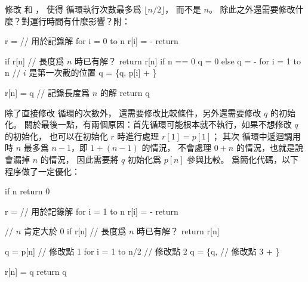 \startEXERCISE
修改  和 ，
使得  循環執行次數最多爲 $\lfloor n/2\rfloor$，
而不是 $n$。
除此之外還需要修改什麼？對運行時間有什麼影響？附：

\startCLRSCODE
r = 	// 用於記錄解
for i = 0 to n
	r[i] = -\infty
return 
\stopCLRSCODE

\startCLRSCODE
if r[n] 	// 長度爲 $n$ 時已有解？
	return r[n]
if n == 0
	q = 0
else
	q = -\infty
	for i = 1 to n	// $i$ 是第一次截的位置
 		q = \max \{q, p[i] + \}

r[n] = q	// 記錄長度爲 $n$ 的解
return q
\stopCLRSCODE
\stopEXERCISE

\startANSWER
除了直接修改  循環的次數外，
還需要修改比較條件，另外還需要修改 $q$ 的初始化。
關於最後一點，有兩個原因：首先循環可能根本就不執行，如果不想修改 $q$ 的初始化，
也可以在初始化 $r$ 時進行處理 $r[1] = p[1]$；
其次 循環中遞迴調用時 $n$ 最多爲 $n-1$，即 $1+(n-1)$ 的情況，
不會處理 $0+n$ 的情況，也就是說會漏掉 $n$ 的情況，
因此需要將 $q$ 初始化爲 $p[n]$ 參與比較。
爲簡化代碼，以下程序做了一定優化：

\startCLRSCODE
if n 
	return 0

r = 	// 用於記錄解
for i = 1 to n
	r[i] = -\infty
return 
\stopCLRSCODE

\startCLRSCODE
// $n$ 肯定大於 $0$
if r[n] 	// 長度爲 $n$ 時已有解？
	return r[n]

q = p[n]	\hfill // 修改點 1
for i = 1 to \lfloor n/2 \rfloor \hfill // 修改點 2
	q = \max \{q,
		 \hfill // 修改點 3
		+ \}

r[n] = q
return q
\stopCLRSCODE

\stopANSWER
